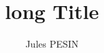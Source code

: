 \def\authors{Jules PESIN}
\def\longTitle{long Title}
\def\shortTitle{short Title}

\title[\shortTitle]{\longTitle}
\author{\authors}